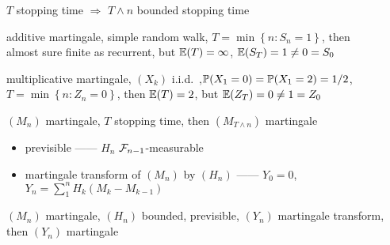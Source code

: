 \begin{fact}
    $T$ stopping time $\Rightarrow$ $T \wedge n$ bounded stopping time
\end{fact}

\begin{counterexample}
    additive martingale, simple random walk, $T = \min \left\{ n : S_n = 1 \right\}$, then \\
    almost sure finite as recurrent, but $\mathbb{E}(T) = \infty$, $\mathbb{E}(S_T) = 1 \neq 0 = S_0$
\end{counterexample}

\begin{counterexample}
    multiplicative martingale, $(X_k)$ i.i.d.\ ,$\mathbb{P}(X_1 = 0) = \mathbb{P}(X_1 = 2) = 1/2$, $T = \min \left\{ n : Z_n = 0 \right\}$, then
    $\mathbb{E}(T) = 2$, but $\mathbb{E}(Z_T) = 0 \neq 1 = Z_0$
\end{counterexample}

\begin{thm}
    $(M_n)$ martingale, $T$ stopping time, then $(M_{T \wedge n})$ martingale
\end{thm}

\begin{itemize}
    \item previsible ------ $H_n$ $\mathcal{F}_{n-1}$-measurable
    \item martingale transform of $(M_n)$ by $(H_n)$ ------ $Y_0 = 0$, $Y_n = \sum^n_1 H_k(M_k - M_{k-1})$
\end{itemize}

\begin{thm}
    $(M_n)$ martingale, $(H_n)$ bounded, previsible, $(Y_n)$ martingale transform, then $(Y_n)$ martingale
\end{thm}

